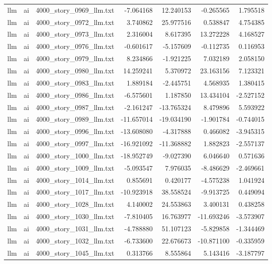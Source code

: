 \begin{longtable}{lllrrrr}
llm & ai & 4000\_story\_0969\_llm.txt & -7.064168 & 12.240153 & -0.265565 & 1.795518 \\
llm & ai & 4000\_story\_0972\_llm.txt & 3.740862 & 25.977516 & 0.538847 & 4.754385 \\
llm & ai & 4000\_story\_0973\_llm.txt & 2.316004 & 8.617395 & 13.272228 & 4.168527 \\
llm & ai & 4000\_story\_0976\_llm.txt & -0.601617 & -5.157609 & -0.112735 & 0.116953 \\
llm & ai & 4000\_story\_0979\_llm.txt & 8.234866 & -1.921225 & 7.032189 & 2.058150 \\
llm & ai & 4000\_story\_0980\_llm.txt & 14.259241 & 5.370972 & 23.163156 & 7.123321 \\
llm & ai & 4000\_story\_0983\_llm.txt & 1.889184 & -2.445751 & 4.568935 & 1.380415 \\
llm & ai & 4000\_story\_0986\_llm.txt & -6.575601 & 1.187850 & 13.434104 & -2.527152 \\
llm & ai & 4000\_story\_0987\_llm.txt & -2.161247 & -13.765324 & 8.479896 & 5.593922 \\
llm & ai & 4000\_story\_0989\_llm.txt & -11.657014 & -19.034190 & -1.901784 & -0.744015 \\
llm & ai & 4000\_story\_0996\_llm.txt & -13.608080 & -4.317888 & 0.466082 & -3.945315 \\
llm & ai & 4000\_story\_0997\_llm.txt & -16.921092 & -11.368882 & 1.882823 & -2.557137 \\
llm & ai & 4000\_story\_1000\_llm.txt & -18.952749 & -9.027390 & 6.046640 & 0.571636 \\
llm & ai & 4000\_story\_1009\_llm.txt & -5.093547 & 7.976035 & -8.486629 & -2.469661 \\
llm & ai & 4000\_story\_1014\_llm.txt & 0.855691 & 0.420177 & -4.575238 & 1.041924 \\
llm & ai & 4000\_story\_1017\_llm.txt & -10.923918 & 38.558524 & -9.913725 & 0.449094 \\
llm & ai & 4000\_story\_1028\_llm.txt & 4.140002 & 24.553863 & 3.400131 & 0.438258 \\
llm & ai & 4000\_story\_1030\_llm.txt & -7.810405 & 16.763977 & -11.693246 & -3.573907 \\
llm & ai & 4000\_story\_1031\_llm.txt & -4.788880 & 51.107123 & -5.829858 & -1.344469 \\
llm & ai & 4000\_story\_1032\_llm.txt & -6.733600 & 22.676673 & -10.871100 & -0.335959 \\
llm & ai & 4000\_story\_1045\_llm.txt & 0.313766 & 8.555864 & 5.143416 & -3.187797 \\

\end{longtable}
